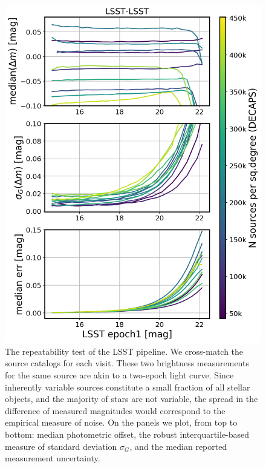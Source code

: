\documentclass[DM,lsstdraft,toc,usenatbib,authoryear]{lsstdoc}
\begin{document}
\begin{figure}
\begin{centering}
\includegraphics[width=0.8\columnwidth]{figs/lsst-lsst_rms_plot.png}
\caption{The repeatability test of the LSST pipeline. We cross-match the source catalogs for each visit. These two brightness measurements for the same source are akin to a two-epoch light curve. Since inherently variable sources constitute a small fraction of all stellar objects, and the majority of stars are not variable, the spread in the difference of measured magnitudes would correspond to the empirical measure of noise. On the panels we plot, from top to bottom: median photometric offset, the robust interquartile-based measure of standard deviation $\sigma_{G}$, and the median reported measurement uncertainty.}
\label{fig:lsst_lsst_dmag}
\end{centering}
\end{figure}
\end{document}

